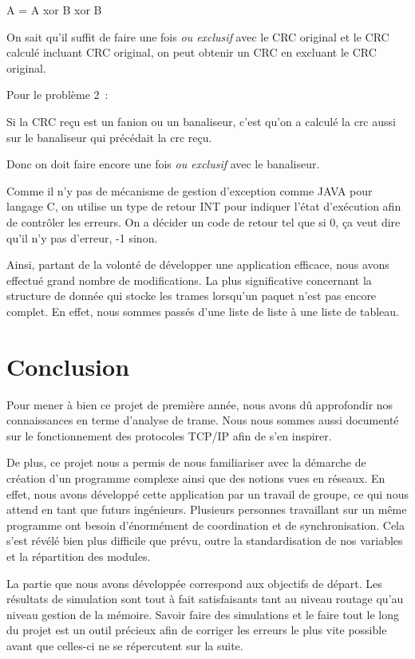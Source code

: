\documentclass[a4paper,11pt]{article}
\begin{document}
A = A xor B xor B

On sait qu'il suffit de faire une fois \textit{ou exclusif} avec le CRC original et le CRC calculé incluant CRC original, on peut obtenir un CRC  en excluant le CRC original.

Pour le problème 2 :

Si la CRC reçu est un fanion ou un banaliseur, c'est qu'on a
 calculé la crc aussi sur le banaliseur qui précédait la crc reçu.

Donc on doit faire encore une fois \textit{ou exclusif} avec le banaliseur.


Comme il n'y pas de mécanisme de gestion d'exception comme JAVA pour langage C, on utilise un type de retour INT pour indiquer l'état d'exécution afin de contrôler les erreurs.
On a décider un code de retour tel que si 0, ça veut dire qu'il n'y pas d'erreur, -1 sinon.

\vspace{0.5cm}

Ainsi, partant de la volonté de développer une application efficace, nous avons effectué grand nombre de modifications. La plus significative concernant la structure de donnée qui stocke les trames lorsqu'un paquet n'est pas encore complet. En effet, nous sommes passés d'une liste de liste à une liste de tableau.

\section{Conclusion}

Pour mener à bien ce projet de première année, nous avons dû approfondir nos connaissances en terme d'analyse de trame. Nous nous sommes aussi documenté sur le fonctionnement des protocoles TCP/IP afin de s'en inspirer.

De plus, ce projet nous a permis de nous familiariser avec la démarche de création d'un programme complexe ainsi  que des notions vues en réseaux. En effet, nous avons développé cette application par un travail de groupe, ce qui nous attend en tant que futurs ingénieurs. Plusieurs personnes travaillant sur un même programme ont besoin d'énormément de coordination et de synchronisation. Cela s'est révélé bien plus difficile que prévu, outre la standardisation de nos variables et la répartition des modules.

La partie que nous avons développée correspond aux objectifs de départ. Les résultats de simulation sont tout à fait satisfaisants tant au niveau routage qu'au niveau gestion de la mémoire. Savoir faire des simulations et le faire tout le long du projet est un outil précieux afin de corriger les erreurs le plus vite possible avant que celles-ci ne se répercutent sur la suite.
\end{document}
